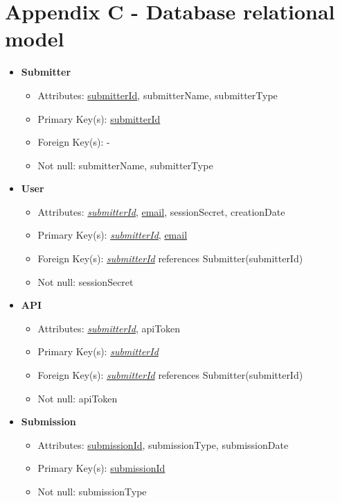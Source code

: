 \section*{Appendix C - Database relational model}
\label{app:relational_model}
    \begin{itemize}
        \item \textbf{Submitter}        
        \begin{itemize}
            \item Attributes: \underline{submitterId}, submitterName, submitterType
            \item Primary Key(s): \underline{submitterId}
            \item Foreign Key(s): -
            \item Not null: submitterName, submitterType
        \end{itemize}

        \item \textbf{User}
        \begin{itemize}
            \item Attributes: \underline{\textit{submitterId}}, \underline{email}, sessionSecret, creationDate
            \item Primary Key(s): \underline{\textit{submitterId}}, \underline{email}
            \item Foreign Key(s): \underline{\textit{submitterId}} references Submitter(submitterId)
            \item Not null: sessionSecret
        \end{itemize}

        \item \textbf{API}
        \begin{itemize}
            \item Attributes: \underline{\textit{submitterId}}, apiToken
            \item Primary Key(s): \underline{\textit{submitterId}}
            \item Foreign Key(s): \underline{\textit{submitterId}} references Submitter(submitterId)
            \item Not null: apiToken
        \end{itemize}

        \item \textbf{Submission}
        \begin{itemize}
            \item Attributes: \underline{submissionId}, submissionType, submissionDate
            \item Primary Key(s): \underline{submissionId}            
            \item Not null: submissionType
        \end{itemize}


\end{itemize}
